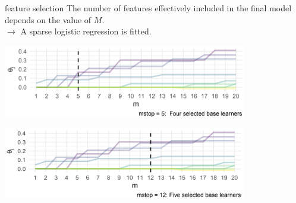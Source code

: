 \begin{vbframe}{feature selection}
The number of features effectively included in the final model depends on the 
value of $M$. \\

$\rightarrow$ A sparse logistic regression is fitted.

\vfill

\begin{center}
\includegraphics[width=0.8\textwidth]{figure_man/mstop5.png}
\end{center}

\vfill

\begin{center}
\includegraphics[width=0.8\textwidth]{figure_man/mstop12.png}
\end{center}

\end{vbframe}


